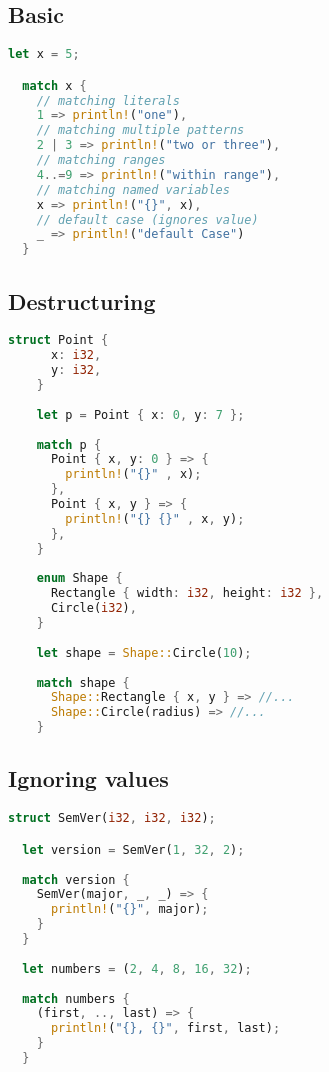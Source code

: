 \documentclass[a4paper]{article}
\begin{document}
\subsection{Basic}

\begin{lstlisting}[language=Rust, style=boxed, numbers=none]
  let x = 5;

  match x {
    // matching literals
    1 => println!("one"),
    // matching multiple patterns
    2 | 3 => println!("two or three"),
    // matching ranges
    4..=9 => println!("within range"),
    // matching named variables
    x => println!("{}", x),
    // default case (ignores value)
    _ => println!("default Case")
  }
\end{lstlisting}

\pagebreak

\subsection{Destructuring}

\begin{lstlisting}[language=Rust, style=boxed, numbers=none]
  struct Point {
      x: i32,
      y: i32,
    }
    
    let p = Point { x: 0, y: 7 };
    
    match p {
      Point { x, y: 0 } => {
        println!("{}" , x);
      },
      Point { x, y } => {
        println!("{} {}" , x, y);
      },
    }
    
    enum Shape {
      Rectangle { width: i32, height: i32 },
      Circle(i32),
    }
    
    let shape = Shape::Circle(10);
    
    match shape {
      Shape::Rectangle { x, y } => //...
      Shape::Circle(radius) => //...
    }
\end{lstlisting}

\subsection{Ignoring values}

\begin{lstlisting}[language=Rust, style=boxed, numbers=none]
  struct SemVer(i32, i32, i32);

  let version = SemVer(1, 32, 2);
  
  match version {
    SemVer(major, _, _) => {
      println!("{}", major);
    }
  }
  
  let numbers = (2, 4, 8, 16, 32);
  
  match numbers {
    (first, .., last) => {
      println!("{}, {}", first, last);
    }
  }
\end{lstlisting}
\end{document}
